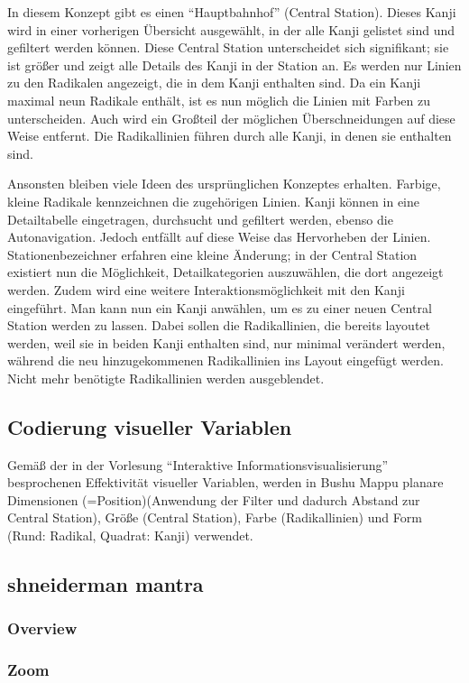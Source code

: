 In diesem Konzept gibt es einen "`Hauptbahnhof"' (Central Station). Dieses Kanji wird in einer vorherigen Übersicht ausgewählt, in der alle Kanji gelistet sind und gefiltert werden können. Diese Central Station unterscheidet sich signifikant; sie ist größer und zeigt alle Details des Kanji in der Station an. Es werden nur Linien zu den Radikalen angezeigt, die in dem Kanji enthalten sind. Da ein Kanji maximal neun Radikale enthält, ist es nun möglich die Linien mit Farben zu unterscheiden. Auch wird ein Großteil der möglichen Überschneidungen auf diese Weise entfernt. Die Radikallinien führen durch alle Kanji, in denen sie enthalten sind.

Ansonsten bleiben viele Ideen des ursprünglichen Konzeptes erhalten. Farbige, kleine Radikale kennzeichnen die zugehörigen Linien. Kanji können in eine Detailtabelle eingetragen, durchsucht und gefiltert werden, ebenso die Autonavigation. Jedoch entfällt auf diese Weise das Hervorheben der Linien. Stationenbezeichner erfahren eine kleine Änderung; in der Central Station existiert nun die Möglichkeit, Detailkategorien auszuwählen, die dort angezeigt werden. Zudem wird eine weitere Interaktionsmöglichkeit mit den Kanji eingeführt. Man kann nun ein Kanji anwählen, um es zu einer neuen Central Station werden zu lassen. Dabei sollen die Radikallinien, die bereits layoutet werden, weil sie in beiden Kanji enthalten sind, nur minimal verändert werden, während die neu hinzugekommenen Radikallinien ins Layout eingefügt werden. Nicht mehr benötigte Radikallinien werden ausgeblendet.

\subsection{Codierung visueller Variablen}
Gemäß der in der Vorlesung "`Interaktive Informationsvisualisierung"' besprochenen Effektivität visueller Variablen, werden in Bushu Mappu planare Dimensionen (=Position)(Anwendung der Filter und dadurch Abstand zur Central Station), Größe (Central Station), Farbe (Radikallinien) und Form (Rund: Radikal, Quadrat: Kanji) verwendet. 

\subsection{shneiderman mantra}
\subsubsection{Overview}
\subsubsection{Zoom}
